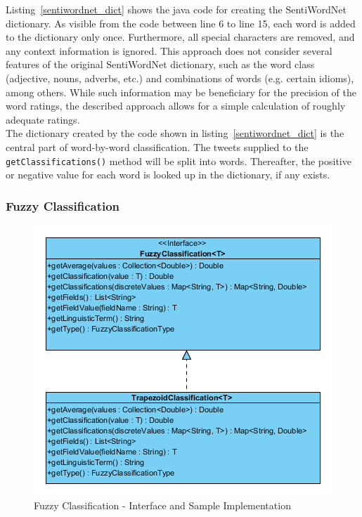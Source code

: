 \documentclass[a4paper]{article}
\begin{document}
Listing~\ref{sentiwordnet_dict} shows the java code for creating the SentiWordNet dictionary. As visible from the code between line 6 to line 15, each word is added to the dictionary only once. Furthermore, all special characters are removed, and any context information is ignored. This approach does not consider several features of the original SentiWordNet dictionary, such as the word class (adjective, nouns, adverbs, etc.) and combinations of words (e.g. certain idioms), among others. While such information may be beneficiary for the precision of the word ratings, the described approach allows for a simple calculation of roughly adequate ratings. \\
The dictionary created by the code shown in listing~\ref{sentiwordnet_dict} is the central part of word-by-word classification. The tweets supplied to the \texttt{getClassifications()} method will be split into words. Thereafter, the positive or negative value for each word is looked up in the dictionary, if any exists.




\subsubsection{Fuzzy Classification}\label{fuzzy_classification}
\begin{figure}[h]
	\centering
	\includegraphics{images/uml_fuzzy.png}
	\caption{Fuzzy Classification - Interface and Sample Implementation}
	\label{uml_fuzzy}
\end{figure}
\end{document}
